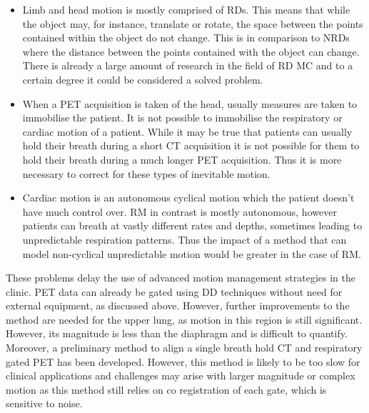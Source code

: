         \begin{itemize}
            \item Limb and head motion is mostly comprised of \gls{RD}s. This means that while the object may, for instance, translate or rotate, the space between the points contained within the object do not change. This is in comparison to \gls{NRD}s where the distance between the points contained with the object can change. There is already a large amount of research in the field of \gls{RD} \gls{MC} and to a certain degree it could be considered a solved problem. %
            
            \item When a \gls{PET} acquisition is taken of the head, usually measures are taken to immobilise the patient. It is not possible to immobilise the respiratory or cardiac motion of a patient. While it may be true that patients can usually hold their breath during a short \gls{CT} acquisition it is not possible for them to hold their breath during a much longer \gls{PET} acquisition. Thus it is more necessary to correct for these types of inevitable motion.
            
            \item Cardiac motion is an autonomous cyclical motion which the patient doesn't have much control over. \gls{RM} in contrast is mostly autonomous, however patients can breath at vastly different rates and depths, sometimes leading to unpredictable respiration patterns. %
            Thus the impact of a method that can model non-cyclical unpredictable motion would be greater in the case of \gls{RM}.
        \end{itemize}
        
        These problems delay the use of advanced motion management strategies in the clinic. \gls{PET} data can already be gated using \gls{DD} techniques without need for external equipment, as discussed above. However, further improvements to the method are needed for the upper lung, as motion in this region is still significant. However, its magnitude is less than the diaphragm and is difficult to quantify. Moreover, a preliminary method to align a single breath hold \gls{CT} and respiratory gated \gls{PET} has been developed. However, this method is likely to be too slow for clinical applications and challenges may arise with larger magnitude or complex motion as this method still relies on co registration of each gate, which is sensitive to noise.
        
